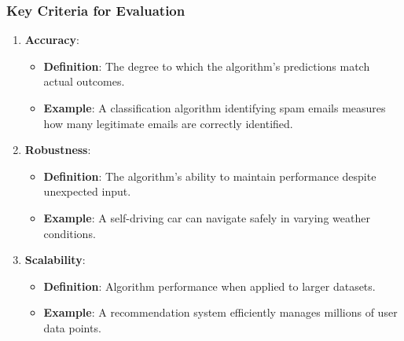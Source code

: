 \documentclass[aspectratio=169]{beamer}
\begin{document}
\begin{frame}[fragile]
    \frametitle{Key Criteria for Evaluation}
    \begin{enumerate}
        \item \textbf{Accuracy}:
            \begin{itemize}
                \item \textbf{Definition}: The degree to which the algorithm’s predictions match actual outcomes.
                \item \textbf{Example}: A classification algorithm identifying spam emails measures how many legitimate emails are correctly identified.
            \end{itemize}
            
        \item \textbf{Robustness}:
            \begin{itemize}
                \item \textbf{Definition}: The algorithm's ability to maintain performance despite unexpected input.
                \item \textbf{Example}: A self-driving car can navigate safely in varying weather conditions.
            \end{itemize}
        
        \item \textbf{Scalability}:
            \begin{itemize}
                \item \textbf{Definition}: Algorithm performance when applied to larger datasets.
                \item \textbf{Example}: A recommendation system efficiently manages millions of user data points.
            \end{itemize}
    \end{enumerate}
\end{frame}
\end{document}
